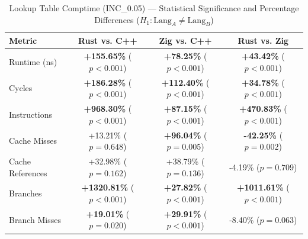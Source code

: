 \begin{table}[htbp]
\centering
\caption{Lookup Table Comptime (INC_0.05) --- Statistical Significance and Percentage Differences ($H_1: \text{Lang}_A \neq \text{Lang}_B$)}
\label{tab:lut_comptime_0_05}
\begin{tabular}{l ccc}
\toprule
\textbf{Metric} & \textbf{Rust vs. C++} & \textbf{Zig vs. C++} & \textbf{Rust vs. Zig} \\
\midrule
Runtime (ns) & \textbf{+155.65\%} ($p < 0.001$) & \textbf{+78.25\%} ($p < 0.001$) & \textbf{+43.42\%} ($p < 0.001$) \\
Cycles & \textbf{+186.28\%} ($p < 0.001$) & \textbf{+112.40\%} ($p < 0.001$) & \textbf{+34.78\%} ($p < 0.001$) \\
Instructions & \textbf{+968.30\%} ($p < 0.001$) & \textbf{+87.15\%} ($p < 0.001$) & \textbf{+470.83\%} ($p < 0.001$) \\
Cache Misses & +13.21\% ($p = 0.648$) & \textbf{+96.04\%} ($p = 0.005$) & \textbf{-42.25\%} ($p = 0.002$) \\
Cache References & +32.98\% ($p = 0.162$) & +38.79\% ($p = 0.136$) & -4.19\% ($p = 0.709$) \\
Branches & \textbf{+1320.81\%} ($p < 0.001$) & \textbf{+27.82\%} ($p < 0.001$) & \textbf{+1011.61\%} ($p < 0.001$) \\
Branch Misses & \textbf{+19.01\%} ($p = 0.020$) & \textbf{+29.91\%} ($p < 0.001$) & -8.40\% ($p = 0.063$) \\
\bottomrule
\end{tabular}
\end{table}


